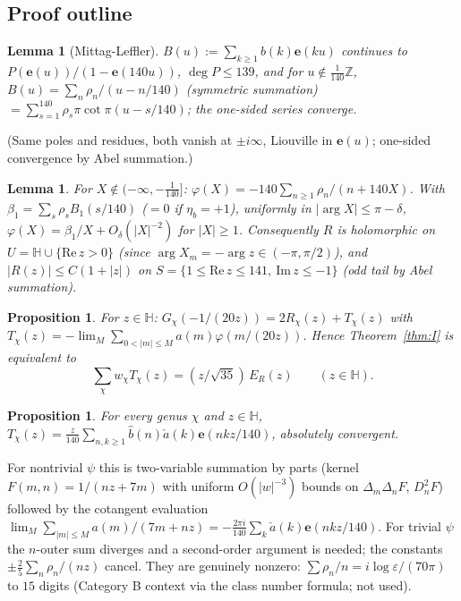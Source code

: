 \documentclass[11pt]{article}
\newtheorem{proposition}[theorem]{Proposition}
\newtheorem{lemma}[theorem]{Lemma}
\theoremstyle{definition}
\newcommand{\Z}{\mathbb{Z}}
\newcommand{\Hb}{\mathbb{H}}
\newcommand{\e}{\mathbf{e}}
\begin{document}
\subsection{Proof outline}
\begin{lemma}[Mittag-Leffler]
$B(u):=\sum_{k\ge1}b(k)\e(ku)$ continues to $P(\e(u))/(1-\e(140u))$, $\deg P\le139$, and for $u\notin\frac1{140}\Z$,
$B(u)=\sum_n\rho_n/(u-n/140)$ (symmetric summation) $=\sum_{s=1}^{140}\rho_s\pi\cot\pi(u-s/140)$; the one-sided series converge.
\end{lemma}
\noindent(Same poles and residues, both vanish at $\pm i\infty$, Liouville in $\e(u)$; one-sided convergence by Abel summation.)

\begin{lemma}
For $X\notin(-\infty,-\tfrac1{140}]$: $\varphi(X)=-140\sum_{n\ge1}\rho_n/(n+140X)$. With $\beta_1=\sum_s\rho_sB_1(s/140)$ ($=0$ if $\eta_b=+1$), uniformly in
$|\arg X|\le\pi-\delta$, $\varphi(X)=\beta_1/X+O_\delta(|X|^{-2})$ for $|X|\ge1$. Consequently $R$ is holomorphic on $U=\Hb\cup\{\mathrm{Re}\,z>0\}$ (since
$\arg X_m=-\arg z\in(-\pi,\pi/2)$), and $|R(z)|\le C(1+|z|)$ on $S=\{1\le\mathrm{Re}\,z\le141,\ \mathrm{Im}\,z\le-1\}$ (odd tail by Abel summation).
\end{lemma}

\begin{proposition}
For $z\in\Hb$: $G_\chi(-1/(20z))=2R_\chi(z)+T_\chi(z)$ with $T_\chi(z)=-\lim_M\sum_{0<|m|\le M}a(m)\varphi(m/(20z))$. Hence Theorem~\ref{thm:I} is equivalent to
\begin{equation}\label{eq:star}\textstyle
\sum_\chi w_\chi T_\chi(z)=(z/\sqrt{35})\,E_R(z)\qquad(z\in\Hb).
\end{equation}
\end{proposition}

\begin{proposition}
For every genus $\chi$ and $z\in\Hb$, $T_\chi(z)=\frac z{140}\sum_{n,k\ge1}\widehat b(n)\check a(k)\e(nkz/140)$, absolutely convergent.
\end{proposition}
\noindent For nontrivial $\psi$ this is two-variable summation by parts (kernel $F(m,n)=1/(nz+7m)$ with uniform $O(|w|^{-3})$ bounds on
$\Delta_m\Delta_nF$, $D_n^2F$) followed by the cotangent evaluation
$\lim_M\sum_{|m|\le M}a(m)/(7m+nz)=-\tfrac{2\pi i}{140}\sum_k\check a(k)\e(nkz/140)$. For trivial $\psi$ the $n$-outer sum diverges and a second-order
argument is needed; the constants $\pm\tfrac25\sum_n\rho_n/(nz)$ cancel. They are genuinely nonzero:
$\sum\rho_n/n=i\log\varepsilon/(70\pi)$ to $15$ digits (Category B context via the class number formula; not used).
\end{document}

